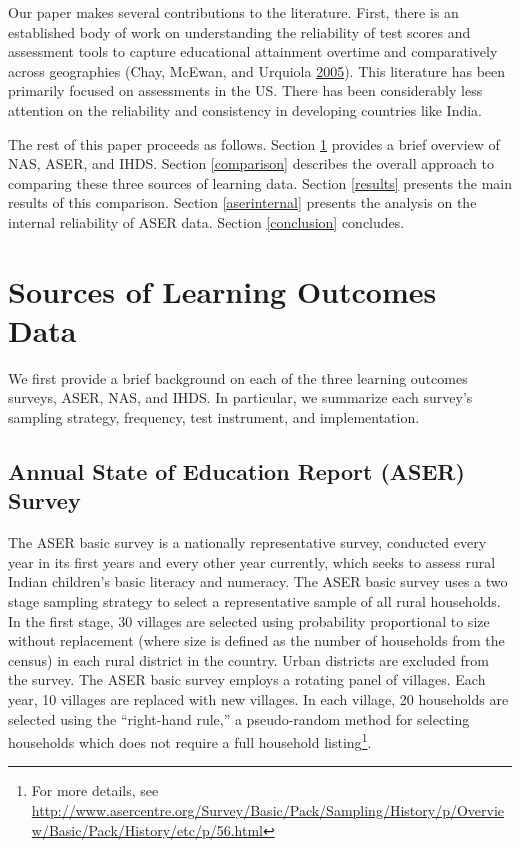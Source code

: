 \documentclass[
  11pt,
]{article}
\begin{document}
Our paper makes several contributions to the literature. First, there is an established body of work on understanding the reliability of test scores and assessment tools to capture educational attainment overtime and comparatively across geographies (Chay, McEwan, and Urquiola \protect\hyperlink{ref-chay2005central}{2005}). This literature has been primarily focused on assessments in the US. There has been considerably less attention on the reliability and consistency in developing countries like India.

The rest of this paper proceeds as follows. Section \ref{learningdata} provides a brief overview of NAS, ASER, and IHDS. Section \ref{comparison} describes the overall approach to comparing these three sources of learning data. Section \ref{results} presents the main results of this comparison. Section \ref{aserinternal} presents the analysis on the internal reliability of ASER data. Section \ref{conclusion} concludes.

\hypertarget{learningdata}{%
\section{Sources of Learning Outcomes Data}\label{learningdata}}

We first provide a brief background on each of the three learning outcomes surveys, ASER, NAS, and IHDS. In particular, we summarize each survey's sampling strategy, frequency, test instrument, and implementation.

\hypertarget{annual-state-of-education-report-aser-survey}{%
\subsection{Annual State of Education Report (ASER) Survey}\label{annual-state-of-education-report-aser-survey}}

The ASER basic survey is a nationally representative survey, conducted every year in its first years and every other year currently, which seeks to assess rural Indian children's basic literacy and numeracy. The ASER basic survey uses a two stage sampling strategy to select a representative sample of all rural households. In the first stage, 30 villages are selected using probability proportional to size without replacement (where size is defined as the number of households from the census) in each rural district in the country. Urban districts are excluded from the survey. The ASER basic survey employs a rotating panel of villages. Each year, 10 villages are replaced with new villages. In each village, 20 households are selected using the ``right-hand rule,'' a pseudo-random method for selecting households which does not require a full household listing\footnote{For more details, see
  \url{http://www.asercentre.org/Survey/Basic/Pack/Sampling/History/p/Overview/Basic/Pack/History/etc/p/56.html}}.
\end{document}

